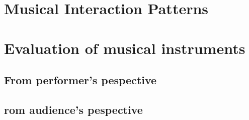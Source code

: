 \section{Musical Interaction Patterns}

\section{Evaluation of musical instruments}
\subsection{From performer's pespective}
\subsection{rom audience's pespective}
